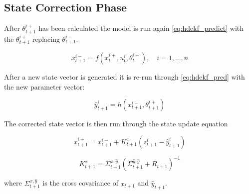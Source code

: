 \subsection{State Correction Phase}

After $\theta_{t+1}^{i+}$ has been calculated the model is run again \eqref{eq:hdekf_predict} with the $\theta_{t+1}^{i+}$ replacing $\theta_{t+1}^{i-}$.

\begin{equation}\label{eq:hdekf_predict_2}
x_{t+1}^{i-} = f(x_{t}^{i+}, u_{t}^{i}, \theta^{i+}_{t}), \quad i=1,...,n
\end{equation}

After a new state vector is generated it is re-run through \eqref{eq:hdekf_pred} with the new parameter vector:

\begin{equation}\label{eq:hdekf_pred_2}
\hat{y}_{t+1}^{i} = h(x_{t+1}^{i-}, \theta_{t+1}^{i+})
\end{equation}

The corrected state vector is then run through the state update equation

\begin{equation}\label{eq:hdekf_state_update}
x_{t+1}^{i+} = x_{t+1}^{i-} + K_{t+1}^{x}(z_{t+1}^{i}-\hat{y}_{t+1}^{i})
\end{equation}
 
\begin{equation}\label{eq:hdekf_param_k}
K_{t+1}^{x} = \Sigma^{x,\hat{y}}_{t+1}(\Sigma^{\hat{y},\hat{y}}_{t+1} + R_{t+1})^{-1}
\end{equation}

where $\Sigma^{x,\hat{y}}_{t+1}$ is the cross covariance of $x_{t+1}$ and $\hat{y}_{t+1}$.



